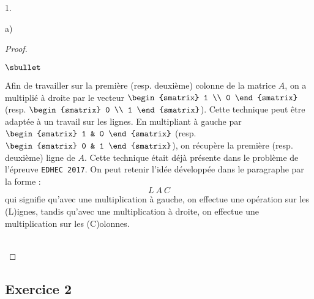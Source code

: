 \begin{noliste}{1.}
\begin{noliste}{a)}
\begin{proof}
\begin{remark}
\begin{noliste}{$\sbullet$}
        \item Afin de travailler sur la première (resp. deuxième)
          colonne de la matrice $A$, on a multiplié à droite par le
          vecteur $
          \begin{smatrix}
            1 \\
            0
          \end{smatrix}
          $ (resp. $\begin{smatrix}
            0 \\
            1
          \end{smatrix}
          $). Cette technique peut être adaptée à un travail sur les
          lignes. En multipliant à gauche par $
          \begin{smatrix}
            1 & 0
          \end{smatrix}
          $ (resp. $ 
          \begin{smatrix} 
            0 & 1
          \end{smatrix}
          $), on récupère la première (resp. deuxième) ligne de
          $A$. Cette technique était déjà présente dans le problème de
          l'épreuve {\tt EDHEC 2017}. On peut retenir l'idée
          développée dans le paragraphe par la forme : 
          \[
          L \ A \ C
          \]
          qui signifie qu'avec une multiplication à gauche, on
          effectue une opération sur les (L)ignes, tandis qu'avec une
          multiplication à droite, on effectue une multiplication sur
          les (C)olonnes.
        \end{noliste}
      \end{remark}~\\[-1.4cm]
    \end{proof}
  \end{noliste}
\end{noliste}


\newpage


\subsection*{Exercice 2}

